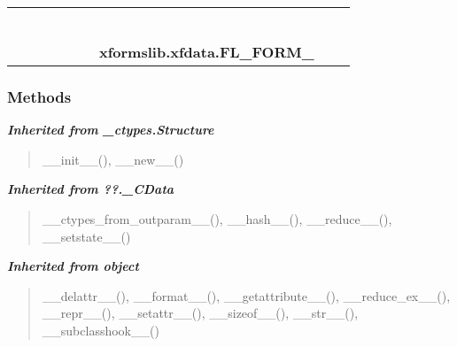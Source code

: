     \label{xformslib:xfdata:FL_FORM_}
\begin{tabular}{cccccccccc}
\multicolumn{2}{r}{\settowidth{\BCL}{object}\multirow{2}{\BCL}{object}}
&&
&&
&&
  \\\cline{3-3}
  &&\multicolumn{1}{c|}{}
&&
&&
&&
  \\
\multicolumn{4}{r}{\settowidth{\BCL}{??.\_CData}\multirow{2}{\BCL}{??.\_CData}}
&&
&&
  \\\cline{5-5}
  &&&&\multicolumn{1}{c|}{}
&&
&&
  \\
\multicolumn{6}{r}{\settowidth{\BCL}{\_ctypes.Structure}\multirow{2}{\BCL}{\_ctypes.Structure}}
&&
  \\\cline{7-7}
  &&&&&&\multicolumn{1}{c|}{}
&&
  \\
&&&&&&\multicolumn{2}{l}{\textbf{xformslib.xfdata.FL\_FORM\_}}
\end{tabular}



  \subsubsection{Methods}


\large{\textbf{\textit{Inherited from \_ctypes.Structure}}}

\begin{quote}
\_\_init\_\_(), \_\_new\_\_()
\end{quote}

\large{\textbf{\textit{Inherited from ??.\_CData}}}

\begin{quote}
\_\_ctypes\_from\_outparam\_\_(), \_\_hash\_\_(), \_\_reduce\_\_(), \_\_setstate\_\_()
\end{quote}

\large{\textbf{\textit{Inherited from object}}}

\begin{quote}
\_\_delattr\_\_(), \_\_format\_\_(), \_\_getattribute\_\_(), \_\_reduce\_ex\_\_(), \_\_repr\_\_(), \_\_setattr\_\_(), \_\_sizeof\_\_(), \_\_str\_\_(), \_\_subclasshook\_\_()
\end{quote}


